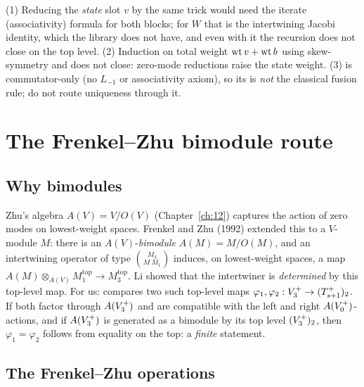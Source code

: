 \begin{warning}[title={Trap / dead end: Dead ends on the way to finiteness}]
(1) Reducing the \emph{state} slot $v$ by the same trick would need the iterate (associativity)
formula for both blocks; for $W$ that is the intertwining Jacobi identity, which the library does not
have, and even with it the recursion does not close on the top level.  (2) Induction on total weight
$\operatorname{wt} v+\operatorname{wt} b$ using skew-symmetry and  does not close: zero-mode reductions raise the
state weight.  (3)  is commutator-only (no $L_{-1}$ or associativity
axiom), so its  is \emph{not} the classical fusion rule; do not route uniqueness
through it.
\end{warning}

\section{The Frenkel--Zhu bimodule route}\label{ch14:sec:fz}

\subsection{Why bimodules}

Zhu's algebra $A(V)=V/O(V)$ (Chapter~\ref{ch:12}) captures the action of zero modes on lowest-weight
spaces.  Frenkel and Zhu (1992) extended this to a $V$-module $M$: there is an $A(V)$-\emph{bimodule}
$A(M)=M/O(M)$, and an intertwining operator of type $\binom{M_3}{M\ M_1}$ induces, on lowest-weight
spaces, a map $A(M)\otimes_{A(V)}M_1^{\mathrm{top}}\to M_3^{\mathrm{top}}$.  Li showed that the
intertwiner is \emph{determined} by this top-level map.  For us:  compares two such
top-level maps $\varphi_1,\varphi_2:V_3^{+}\to(T_{s+1}^+)_2$.  If both factor through $A(V_3^{+})$ and are
compatible with the left and right $A(V_0^{+})$-actions, and if $A(V_3^{+})$ is generated as a bimodule by
its top level $(V_3^{+})_2$, then $\varphi_1=\varphi_2$ follows from equality on the top: a \emph{finite}
statement.

\subsection{The Frenkel--Zhu operations}

